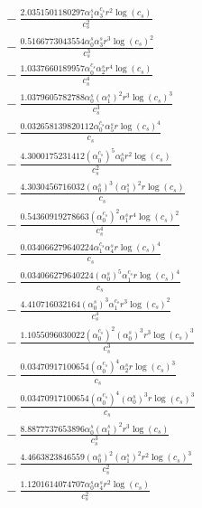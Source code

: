 \documentclass[10pt]{article}
\begin{document}
\begin{align*}
&{}  - \frac{2.0351501180297 \alpha_{1}^s \alpha_{3}^{c_s} r^{2} \log{\left(c_{s} \right)}}{c_{s}^{2}} \\
&{}  - \frac{0.5166773043554 \alpha_{0}^s \alpha_{3}^s r^{3} \log{\left(c_{s} \right)}^{2}}{c_{s}^{3}} \\
&{}  - \frac{1.0337660189957 \alpha_{0}^{c_s} \alpha_{2}^s r^{4} \log{\left(c_{s} \right)}}{c_{s}^{4}} \\
&{}  - \frac{1.0379605782788 \alpha_{0}^s \left(\alpha_{1}^s\right)^{2} r^{3} \log{\left(c_{s} \right)}^{3}}{c_{s}^{3}} \\
&{}  - \frac{0.032658139820112 \alpha_{0}^{c_s} \alpha_{5}^s r \log{\left(c_{s} \right)}^{4}}{c_{s}} \\
&{}  - \frac{4.3000175231412 \left(\alpha_{0}^{c_s}\right)^{5} \alpha_{0}^s r^{2} \log{\left(c_{s} \right)}}{c_{s}^{2}} \\
&{}  - \frac{4.3030456716032 \left(\alpha_{0}^s\right)^{3} \left(\alpha_{1}^s\right)^{2} r \log{\left(c_{s} \right)}}{c_{s}} \\
&{}  - \frac{0.54360919278663 \left(\alpha_{0}^{c_s}\right)^{2} \alpha_{1}^s r^{4} \log{\left(c_{s} \right)}^{2}}{c_{s}^{4}} \\
&{}  - \frac{0.034066279640224 \alpha_{1}^{c_s} \alpha_{4}^s r \log{\left(c_{s} \right)}^{4}}{c_{s}} \\
&{}  - \frac{0.034066279640224 \left(\alpha_{0}^s\right)^{5} \alpha_{1}^{c_s} r \log{\left(c_{s} \right)}^{4}}{c_{s}} \\
&{}  - \frac{4.410716032164 \left(\alpha_{0}^s\right)^{3} \alpha_{1}^{c_s} r^{3} \log{\left(c_{s} \right)}^{2}}{c_{s}^{3}} \\
&{}  - \frac{1.1055096030022 \left(\alpha_{0}^{c_s}\right)^{2} \left(\alpha_{0}^s\right)^{3} r^{3} \log{\left(c_{s} \right)}^{3}}{c_{s}^{3}} \\
&{}  - \frac{0.03470917100654 \left(\alpha_{0}^{c_s}\right)^{4} \alpha_{2}^s r \log{\left(c_{s} \right)}^{3}}{c_{s}} \\
&{}  - \frac{0.03470917100654 \left(\alpha_{0}^{c_s}\right)^{4} \left(\alpha_{0}^s\right)^{3} r \log{\left(c_{s} \right)}^{3}}{c_{s}} \\
&{}  - \frac{8.8877737653896 \alpha_{0}^s \left(\alpha_{1}^s\right)^{2} r^{3} \log{\left(c_{s} \right)}}{c_{s}^{3}} \\
&{}  - \frac{4.4663823846559 \left(\alpha_{0}^s\right)^{2} \left(\alpha_{1}^s\right)^{2} r^{2} \log{\left(c_{s} \right)}^{3}}{c_{s}^{2}} \\
&{}  - \frac{1.1201614074707 \alpha_{0}^s \alpha_{4}^s r^{2} \log{\left(c_{s} \right)}}{c_{s}^{2}} \\

\end{align*}
\end{document}
